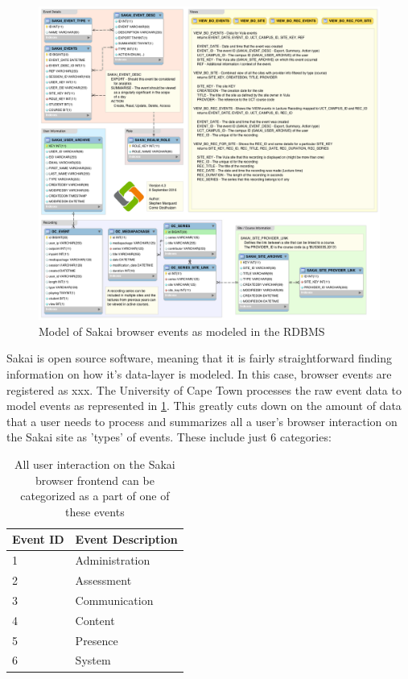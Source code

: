 \begin{figure}[h]
    \centering
    \includegraphics[scale=0.4]{./resources/figures/sakaiEventModel}
    \caption[Sakai]{Model of Sakai browser events as modeled in the RDBMS}
    \label{Sakai}
\end{figure}

Sakai is open source software, meaning that it is fairly straightforward finding information on how it's data-layer is modeled. In this case, browser events are registered as xxx. The University of Cape Town processes the raw event data to model events as represented in \ref{Sakai}. This greatly cuts down on the amount of data that a user needs to process and summarizes all a user's browser interaction on the Sakai site as 'types' of events. These include just 6 categories:

\begin{table}[]
    \centering
    \begin{tabular}{|l|l|}
        \hline
        Event ID & Event Description \\ \hline
        1        & Administration    \\
        2        & Assessment        \\
        3        & Communication     \\
        4        & Content           \\
        5        & Presence          \\
        6        & System            \\ \hline
    \end{tabular}
    \caption[Sakai Event Types]{All user interaction on the Sakai browser frontend can be categorized as a part of one of these events}
    \label{SakaiEventTypes}
\end{table}

